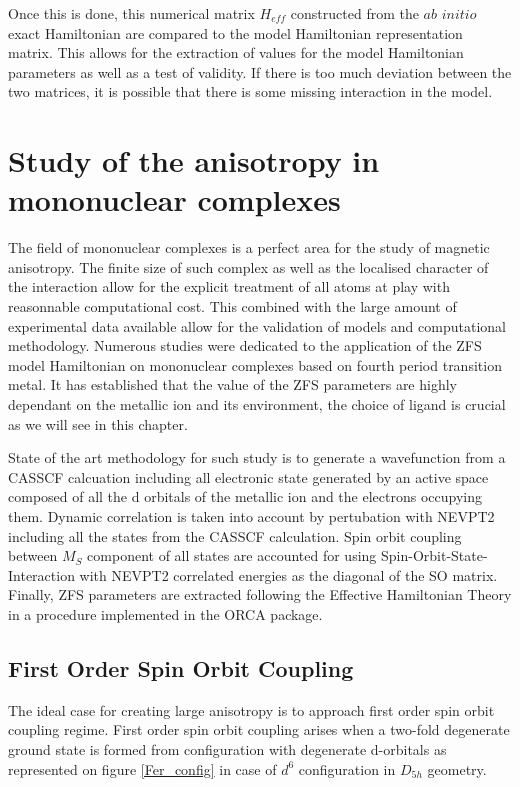 \documentclass[10pt]{report}
\numberwithin{equation}{section}
\begin{document}
Once this is done, this numerical matrix $H_{eff}$ constructed from the $\textit{ab}$ $\textit{initio}$ exact Hamiltonian are compared to the model Hamiltonian representation matrix. 
This allows for the extraction of values for the model Hamiltonian parameters as well as a test of validity.
If there is too much deviation between the two matrices, it is possible that there is some missing interaction in the model.

\chapter{Study of the anisotropy in mononuclear complexes}

The field of mononuclear complexes is a perfect area for the study of magnetic anisotropy. 
The finite size of such complex as well as the localised character of the interaction allow for the explicit treatment of all atoms at play with reasonnable computational cost.
This combined with the large amount of experimental data available allow for the validation of models and computational methodology.
Numerous studies were dedicated to the application of the ZFS model Hamiltonian on mononuclear complexes based on fourth period transition metal.
It has established that the value of the ZFS parameters are highly dependant on the metallic ion and its environment, the choice of ligand is crucial as we will see in this chapter.
\par State of the art methodology for such study is to generate a wavefunction from a CASSCF calcuation including all electronic state generated by an active space composed of all the d orbitals of the metallic ion and the electrons occupying them. 
Dynamic correlation is taken into account by pertubation with NEVPT2 including all the states from the CASSCF calculation. 
Spin orbit coupling between $M_S$ component of all states are accounted for using Spin-Orbit-State-Interaction with NEVPT2 correlated energies as the diagonal of the SO matrix.
Finally, ZFS parameters are extracted following the Effective Hamiltonian Theory in a procedure implemented in the ORCA package.

\section{First Order Spin Orbit Coupling}

The ideal case for creating large anisotropy is to approach first order spin orbit coupling regime. 
First order spin orbit coupling arises when a two-fold degenerate ground state is formed from configuration with degenerate d-orbitals as represented on figure \ref{Fer_config} in case of $d^6$ configuration in $D_{5h}$ geometry.
\end{document}
